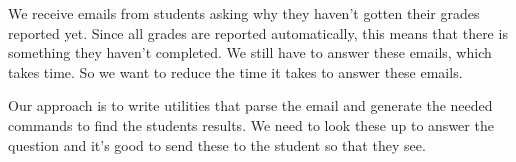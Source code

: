 We receive emails from students asking why they haven't gotten their grades 
reported yet.
Since all grades are reported automatically, this means that there is something 
they haven't completed.
We still have to answer these emails, which takes time.
So we want to reduce the time it takes to answer these emails.

Our approach is to write utilities that parse the email and generate the needed 
commands to find the students results.
We need to look these up to answer the question and it's good to send these to 
the student so that they see.
